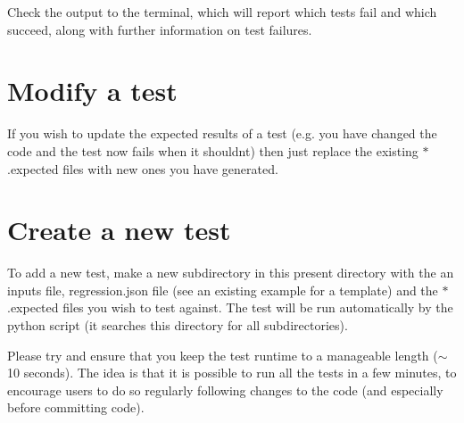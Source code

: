 Check the output to the terminal, which will report which tests fail and which succeed, along with further information on test failures.

\section*{Modify a test}

If you wish to update the expected results of a test (e.\+g. you have changed the code and the test now \textquotesingle{}fails\textquotesingle{} when it shouldn\textquotesingle{}t) then just replace the existing {\ttfamily $\ast$.expected} files with new ones you have generated.

\section*{Create a new test}

To add a new test, make a new subdirectory in this present directory with the an {\ttfamily inputs} file, {\ttfamily regression.\+json} file (see an existing example for a template) and the {\ttfamily $\ast$.expected} files you wish to test against. The test will be run automatically by the python script (it searches this directory for all subdirectories).

Please try and ensure that you keep the test runtime to a manageable length ($\sim$10 seconds). The idea is that it is possible to run all the tests in a few minutes, to encourage users to do so regularly following changes to the code (and especially before committing code). 
